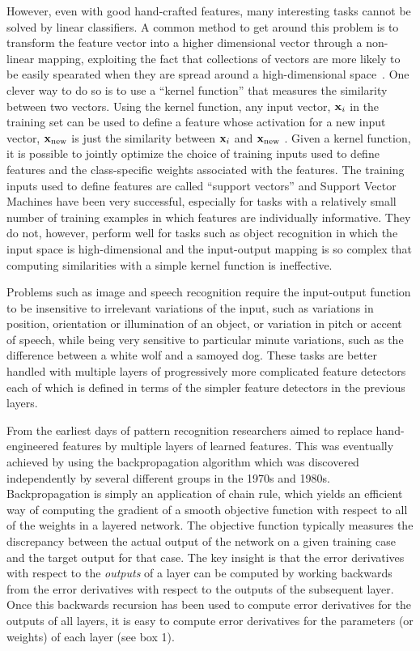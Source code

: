 \documentclass[]{article}
\begin{document}
However, even with good hand-crafted features, many interesting tasks cannot be solved by linear classifiers. A common
method to get around this problem is to transform the feature vector into a higher dimensional vector through a
non-linear mapping, exploiting the fact that collections of vectors are more likely to be easily spearated when they
are spread around a high-dimensional space~\cite{cover}. One clever way to do so is to use a ``kernel function'' that
measures the similarity between two vectors.  Using the kernel function, any input vector, ${\bf x}_i$ in the training
set can be used to define a feature whose activation for a new input vector, ${\bf x}_{\rm new}$ is just the
similarity between ${\bf x}_i$ and ${\bf x}_{\rm new}$ . Given a kernel function, it is possible to jointly optimize
the choice of training inputs used to define features and the class-specific weights associated with the
features\cite{}. The training inputs used to define features are called ``support vectors'' and Support Vector
Machines\cite{Vapnik} have been very successful, especially for tasks with a relatively small number of training
examples in which features are individually informative. They do not, however, perform well for tasks such as object
recognition in which the input space is high-dimensional and the input-output mapping is so
complex that computing similarities with a simple kernel function is ineffective. 

Problems such as image and speech recognition require the input-output function to be insensitive to irrelevant
variations of the input, such as variations in position, orientation or illumination of an object, or variation in
pitch or accent of speech, while being very sensitive to particular minute variations, such as the difference between
a white wolf and a samoyed dog. These tasks are better handled with multiple layers of progressively more
complicated feature detectors each of which is defined in terms of the simpler feature detectors in the previous
layers.

From the earliest days of pattern recognition\cite{selfridge, rosenblatt} researchers aimed to replace hand-engineered
features by multiple layers of learned features.  This was eventually achieved by using the backpropagation algorithm
which was discovered independently by several different groups in the 1970s and 1980s\cite{Werbos, Parker, Lecun,
  Rumelhart, schmidreference}.  Backpropagation is simply an application of chain rule, which yields an efficient way
of computing the gradient of a smooth objective function with respect to all of the weights in a layered network. The
objective function typically measures the discrepancy between the actual output of the network on a given training
case and the target output for that case.  The key insight is that the error derivatives with respect to the {\it
  outputs} of a layer can be computed by working backwards from the error derivatives with respect to the outputs of
the subsequent layer. Once this backwards recursion has been used to compute error derivatives for the outputs of all
layers, it is easy to compute error derivatives for the parameters (or weights) of each layer (see box 1).
\end{document}
